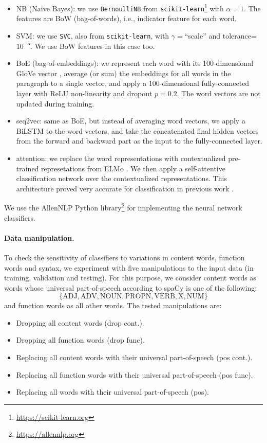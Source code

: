 \documentclass[11pt,a4paper,table]{article}
\begin{document}
\begin{itemize}
  \item NB (Naive Bayes): we use \texttt{BernoulliNB} from
  \texttt{scikit-learn}\footnote{\url{https://scikit-learn.org}}
  with $\alpha=1$.
  The features are BoW (bag-of-words), i.e., indicator feature for each word.
  \item SVM: we use \texttt{SVC}, also from \texttt{scikit-learn},
  with $\gamma=$``scale'' and tolerance=$10^{-5}$.
  We use BoW features in this case too.
  \item BoE (bag-of-embeddings): we represent each word with its 100-dimensional
  GloVe vector \cite{pennington2014glove}, average (or sum) the embeddings for all words in the paragraph
  to a single vector, and apply a 100-dimensional fully-connected layer with
  ReLU non-linearity and dropout $p=0.2$.
  The word vectors are not updated during training.
  \item seq2vec: same as BoE, but instead of averaging word vectors,
  we apply a BiLSTM to the word vectors, and take the concatenated
  final hidden vectors from the forward and backward part as the input to the
  fully-connected layer.
  \item attention: we replace the word representations with contextualized
  pre-trained represetations from ELMo \cite{Peters:2018}. We then apply a self-attentive
  classification network \cite{mccann2017learned} over the contextualized representations. This architecture proved very accurate for classification in
  previous work \cite{W18-5427,D18-1401}.
\end{itemize}

We use the AllenNLP Python library\footnote{\url{https://allennlp.org}}
\cite{Gardner2017AllenNLP} for implementing the neural network classifiers.

\paragraph{Data manipulation.}

To check the sensitivity of classifiers to variations in content words,
function words and syntax, we experiment with five manipulations to the input
data (in training, validation and testing).
For this purpose, we consider content words as words whose universal part-of-speech
according to spaCy is one of the following:
\[\{\mathrm{ADJ, ADV, NOUN, PROPN, VERB, X, NUM}\}\]
and function words as all other words.
The tested manipulations are:

\begin{itemize}
  \item Dropping all content words (drop cont.).
  \item Dropping all function words (drop func).
  \item Replacing all content words with their universal part-of-speech (pos cont.).
  \item Replacing all function words with their universal part-of-speech (pos func).
  \item Replacing all words with their universal part-of-speech (pos).
\end{itemize}
\end{document}
